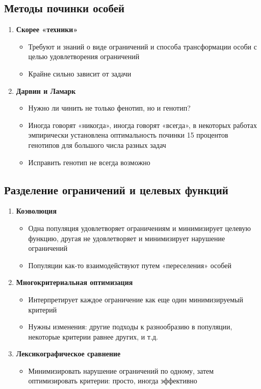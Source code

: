\subsection{Методы починки особей}
\begin{enumerate}
    \item \textbf{Скорее «техники»}
    \begin{itemize}
        \item Требуют и знаний о виде ограничений и способа трансформации особи с целью удовлетворения ограничений
        \item Крайне сильно зависит от задачи
    \end{itemize}

    \item \textbf{Дарвин и Ламарк}
    \begin{itemize}
        \item Нужно ли чинить не только фенотип, но и генотип?
        \item Иногда говорят «никогда», иногда говорят «всегда», в некоторых работах эмпирически установлена оптимальность починки 15 процентов генотипов для большого числа разных задач
        \item Исправить генотип не всегда возможно
    \end{itemize}

\end{enumerate}

\subsection{Разделение ограничений и целевых функций}
\begin{enumerate}
    \item \textbf{Коэволюция}
    \begin{itemize}
        \item Одна популяция удовлетворяет ограничениям и минимизирует целевую функцию, другая не удовлетворяет и минимизирует нарушение ограничений
        \item Популяции как-то взаимодействуют путем «переселения» особей
    \end{itemize}

    \item \textbf{Многокритериальная оптимизация}
    \begin{itemize}
        \item Интерпретирует каждое ограничение как еще один минимизируемый критерий
        \item Нужны изменения: другие подходы к разнообразию в популяции, некоторые критерии равнее других, и т.д.
    \end{itemize}

    \item \textbf{Лексикографическое сравнение}
    \begin{itemize}
        \item  Минимизировать нарушение ограничений по одному, затем оптимизировать критерии: просто, иногда эффективно
    \end{itemize}
\end{enumerate}
